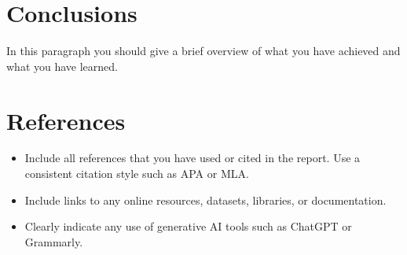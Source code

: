 \documentclass[11pt]{article}
\begin{document}
\section{Conclusions}

In this paragraph you should give a brief overview of what you have achieved and what you have learned.

\section{References}

\begin{itemize}
    \item Include all references that you have used or cited in the report. Use a consistent citation style such as APA or MLA.
    \item Include links to any online resources, datasets, libraries, or documentation.
    \item Clearly indicate any use of generative AI tools such as ChatGPT or Grammarly.
\end{itemize}











\printbibliography

\newpage

\begin{appendices}

\end{appendices}
\end{document}
